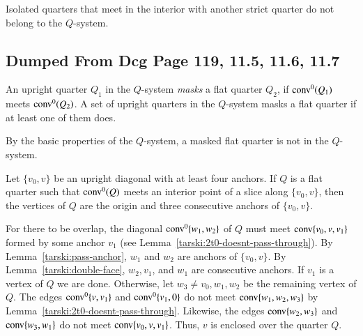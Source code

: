 \begin{tarskidata}
\begin{tarski}
Isolated quarters that meet in the interior with another strict
quarter do not belong to the $Q$-system.
\end{tarski}








\begin{tarski}
\section{Dumped From Dcg Page 119, 11.5, 11.6, 11.7}
\begin{definition}[mask]
An upright quarter $Q_1$ in the $Q$-system
{\it masks} a flat quarter $Q_2$, if
${\operatorname{conv}}^0(Q_1)$ meets ${\operatorname{conv}}^0(Q_2)$.   A set of upright
quarters in the $Q$-system masks a flat quarter if at least 
one of them does.
\end{definition}

By the basic properties of the $Q$-system, a masked flat quarter is
not in the $Q$-system.
\end{tarski}


\begin{tarski}

\begin{lemma}
Let $\{v_0,v\}$ be an upright diagonal with at least four anchors.
If $Q$ is a flat quarter such that ${\operatorname{conv}}^0(Q)$  meets  
an interior point of 
a slice along $\{v_0,v\}$, then the vertices of $Q$ are the
origin and three consecutive anchors of $\{v_0,v\}$.
\end{lemma}

\begin{proved}
For there to be overlap, the diagonal ${\operatorname{conv}}^0\{w_1,w_2\}$ of $Q$ 
must meet
 ${\operatorname{conv}}\{v_0,v,v_1\}$ formed by some anchor $v_1$  (see
Lemma~\ref{tarski:2t0-doesnt-pass-through}).  By
Lemma~\ref{tarski:pass-anchor}, $w_1$ and $w_2$ are anchors of
$\{v_0,v\}$. By Lemma~\ref{tarski:double-face}, $w_2,v_1$, and $w_1$
are consecutive anchors. If $v_1$ is a vertex of $Q$ we are done.
Otherwise, let $w_3\ne v_0,w_1,w_2$ be the remaining vertex of $Q$.
The edges ${\operatorname{conv}}^0\{v,v_1\}$ and ${\operatorname{conv}}^0\{v_1,0\}$ do not
meet
${\operatorname{conv}}\{w_1,w_2,w_3\}$ by Lemma~\ref{tarski:2t0-doesnt-pass-through}.
Likewise, the edges ${\operatorname{conv}}\{w_2,w_3\}$ and ${\operatorname{conv}}\{w_3,w_1\}$ 
do not meet
 ${\operatorname{conv}}\{v_0,v,v_1\}$. Thus, $v$ is enclosed over the
quarter $Q$.


\end{proved}
\end{tarski}
\end{tarskidata}

